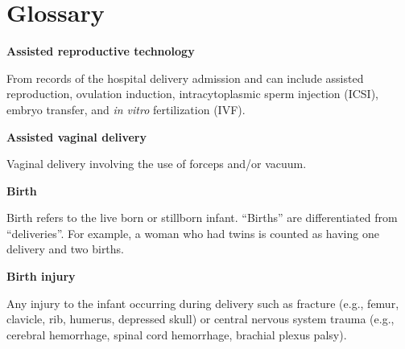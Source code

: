 \documentclass[
]{krantz}
\begin{document}
\begin{table}[H]
\centering
{}
\end{table}

\hypertarget{glossary}{%
\chapter*{Glossary}\label{glossary}}


\textbf{Assisted reproductive technology}

From records of the hospital delivery admission and can include assisted reproduction, ovulation induction, intracytoplasmic sperm injection (ICSI), embryo transfer, and \emph{in vitro} fertilization (IVF).

\textbf{Assisted vaginal delivery}

Vaginal delivery involving the use of forceps and/or vacuum.

\textbf{Birth}

Birth refers to the live born or stillborn infant. ``Births'' are differentiated from ``deliveries''. For example, a woman who had twins is counted as having one delivery and two births.

\textbf{Birth injury}

Any injury to the infant occurring during delivery such as fracture (e.g., femur, clavicle, rib, humerus, depressed skull) or central nervous system trauma (e.g., cerebral hemorrhage, spinal cord hemorrhage, brachial plexus palsy).
\end{document}
